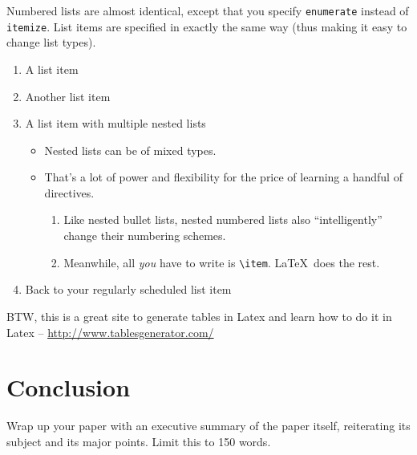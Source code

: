 \documentclass{article}
\begin{document}
Numbered lists are almost identical, except that you specify \verb!enumerate! instead of \verb!itemize!.  List items are specified in exactly the same way (thus making it easy to change list types).

\begin{enumerate}
\item A list item
\item Another list item
\item A list item with multiple nested lists

\begin{itemize}
\item Nested lists can be of mixed types.
\item That's a lot of power and flexibility for the price of learning a handful of directives.

\begin{enumerate}
\item Like nested bullet lists, nested numbered lists also ``intelligently'' change their numbering schemes.
\item Meanwhile, all \emph{you} have to write is \verb!\item!.  \LaTeX\ does the rest.
\end{enumerate}
\end{itemize}

\item Back to your regularly scheduled list item

\end{enumerate}

BTW, this is a great site to generate tables in Latex and learn how to do it in Latex -- \url{http://www.tablesgenerator.com/}


\section{Conclusion}

Wrap up your paper with an executive summary of the paper itself, reiterating its subject and its major points. Limit this to 150 words.
\end{document}

